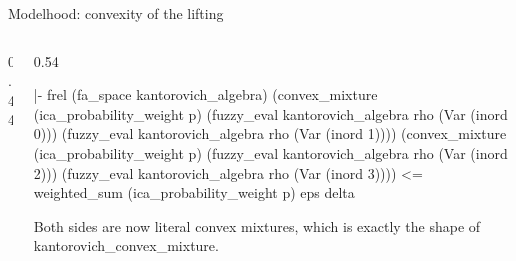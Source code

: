 \documentclass[10pt,aspectratio=169]{beamer}
\newcommand{\rid}[1]{{\ttfamily\small #1}}
\begin{document}
            \begin{frame}[fragile]{Modelhood: convexity of the lifting}
                \begin{columns}[T]
                    \begin{column}{0.44\textwidth}
                    \end{column}
                    \begin{column}{0.54\textwidth}
                        \begin{goalbox}[title={after
                            \texttt{rewrite !kantorovich\_eval\_op}}]
                            \begin{gconc}
|- frel (fa_space kantorovich_algebra)
     (convex_mixture (ica_probability_weight p)
        (fuzzy_eval kantorovich_algebra rho (Var (inord 0)))
        (fuzzy_eval kantorovich_algebra rho (Var (inord 1))))
     (convex_mixture (ica_probability_weight p)
        (fuzzy_eval kantorovich_algebra rho (Var (inord 2)))
        (fuzzy_eval kantorovich_algebra rho (Var (inord 3))))
   <= weighted_sum (ica_probability_weight p) eps delta
                            \end{gconc}
                        \end{goalbox}
                        {\footnotesize Both sides are now literal convex
                            mixtures, which is exactly the shape of
                        \rid{kantorovich\_convex\_mixture}.}
                    \end{column}
                \end{columns}
            \end{frame}
\end{document}
